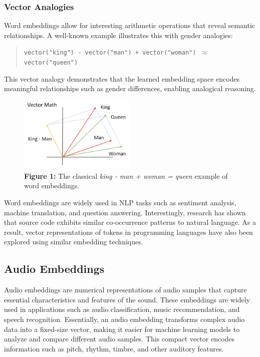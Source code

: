 \subsubsection*{Vector Analogies}

Word embeddings allow for interesting arithmetic operations that reveal semantic relationships. A well-known example illustrates this with gender analogies:

\begin{quote}
\centering
\texttt{vector("king") - vector("man") + vector("woman") $\approx$ vector("queen")}
\end{quote}

This vector analogy demonstrates that the learned embedding space encodes meaningful relationships such as gender differences, enabling analogical reasoning.

\begin{figure}[htbp]
  \centering
  \includegraphics[width=0.5\textwidth]{images/Word Embedding Example.png}
  \caption*{\textbf{Figure 1:} The classical \textit{king - man + woman = queen} example of word embeddings.} %
  \label{fig:indexing-process-manual}
\end{figure}

Word embeddings are widely used in NLP tasks such as sentiment analysis, machine translation, and question answering. Interestingly, research has shown that source code exhibits similar co-occurrence patterns to natural language. As a result, vector representations of tokens in programming languages have also been explored using similar embedding techniques.

\subsection*{Audio Embeddings}
\label{sssec:audio-embeddings}

Audio embeddings are numerical representations of audio samples that capture essential characteristics and features of the sound. These embeddings are widely used in applications such as audio classification, music recommendation, and speech recognition. Essentially, an audio embedding transforms complex audio data into a fixed-size vector, making it easier for machine learning models to analyze and compare different audio samples. This compact vector encodes information such as pitch, rhythm, timbre, and other auditory features.

